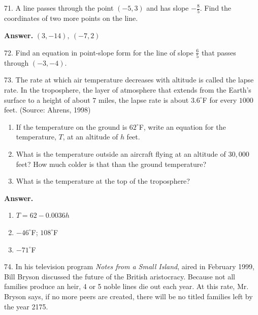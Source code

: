 \documentclass[10pt,]{book}
\theoremstyle{plain}
\theoremstyle{definition}
\theoremstyle{definition}
\theoremstyle{definition}
\theoremstyle{definition}
\numberwithin{equation}{part}
\newcommand\degree[0]{^{\circ}}
\begin{document}
\begin{exerciselist}
\item[71.]\hypertarget{exercise-467}{}A line passes through the point \((-5, 3)\) and has slope \(-\frac{8}{5} \). Find the coordinates of two more points on the line.%
\par\smallskip
\par\smallskip
\noindent\textbf{Answer.}\hypertarget{answer-258}{}\quad
\((3,-14), ~(-7, 2)\)%
\item[72.]\hypertarget{exercise-468}{}Find an equation in point-slope form for the line of slope \(\frac{6}{5}\) that passes through \((-3, -4)\).%
\par\smallskip
\item[73.]\hypertarget{exercise-469}{}The rate at which air temperature decreases with altitude is called the lapse rate. In the troposphere, the layer of atmosphere that extends from the Earth’s surface to a height of about \(7\) miles, the lapse rate is about \(3.6\degree\)F for every \(1000\) feet. (Source: Ahrens, 1998) \leavevmode%
\begin{enumerate}[label=*\alph**]
\item\hypertarget{li-1647}{}If the temperature on the ground is \(62\degree\)F, write an equation for the temperature, \(T\), at an altitude of \(h\) feet.%
\item\hypertarget{li-1648}{}What is the temperature outside an aircraft flying at an altitude of \(30,000\) feet? How much colder is that than the ground temperature?%
\item\hypertarget{li-1649}{}What is the temperature at the top of the troposphere?%
\end{enumerate}
%
\par\smallskip
\par\smallskip
\noindent\textbf{Answer.}\hypertarget{answer-259}{}\quad
\leavevmode%
\begin{multicols}{3}
\begin{enumerate}[label=*\alph**]
\item\hypertarget{li-1650}{}\(T = 62 - 0.0036h\)%
\item\hypertarget{li-1651}{}\(-46\degree\)F; \(108\degree\)F%
\item\hypertarget{li-1652}{}\(-71\degree\)F%
\end{enumerate}
\end{multicols}
%
\item[74.]\hypertarget{exercise-470}{}In his television program \textsl{Notes from a Small Island}, aired in February 1999, Bill Bryson discussed the future of the British aristocracy. Because not all families produce an heir, 4 or 5 noble lines die out each year. At this rate, Mr. Bryson says, if no more peers are created, there will be no titled families left by the year 2175. \leavevmode%

\end{exerciselist}
\end{document}
